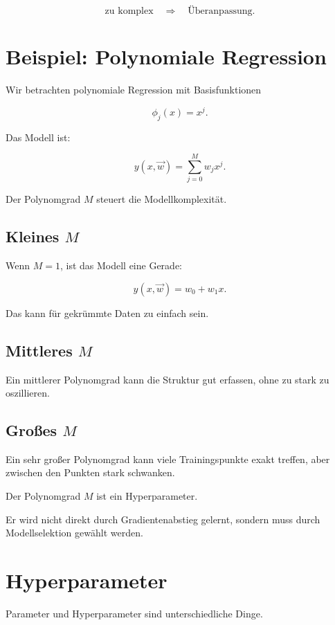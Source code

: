 \[
    \text{zu komplex}
    \quad
    \Rightarrow
    \quad
    \text{Überanpassung}.
\]

\section{Beispiel: Polynomiale Regression}

Wir betrachten polynomiale Regression mit Basisfunktionen

\[
    \phi_j(x)=x^j.
\]

Das Modell ist:

\[
    y(x,\vec{w})
    =
    \sum_{j=0}^{M}
    w_jx^j.
\]

Der Polynomgrad \(M\) steuert die Modellkomplexität.

\subsection{Kleines \(M\)}

Wenn \(M=1\), ist das Modell eine Gerade:

\[
    y(x,\vec{w})
    =
    w_0+w_1x.
\]

Das kann für gekrümmte Daten zu einfach sein.

\subsection{Mittleres \(M\)}

Ein mittlerer Polynomgrad kann die Struktur gut erfassen, ohne zu stark zu oszillieren.

\subsection{Großes \(M\)}

Ein sehr großer Polynomgrad kann viele Trainingspunkte exakt treffen, aber zwischen den Punkten stark schwanken.

\begin{conceptbox}
Der Polynomgrad \(M\) ist ein Hyperparameter.

Er wird nicht direkt durch Gradientenabstieg gelernt, sondern muss durch Modellselektion gewählt werden.
\end{conceptbox}

\section{Hyperparameter}

Parameter und Hyperparameter sind unterschiedliche Dinge.

